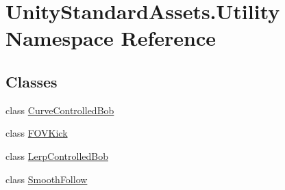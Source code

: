 \hypertarget{namespace_unity_standard_assets_1_1_utility}{}\section{Unity\+Standard\+Assets.\+Utility Namespace Reference}
\label{namespace_unity_standard_assets_1_1_utility}
\subsection*{Classes}
\begin{DoxyCompactItemize}
\item 
class \hyperlink{class_unity_standard_assets_1_1_utility_1_1_curve_controlled_bob}{Curve\+Controlled\+Bob}
\item 
class \hyperlink{class_unity_standard_assets_1_1_utility_1_1_f_o_v_kick}{F\+O\+V\+Kick}
\item 
class \hyperlink{class_unity_standard_assets_1_1_utility_1_1_lerp_controlled_bob}{Lerp\+Controlled\+Bob}
\item 
class \hyperlink{class_unity_standard_assets_1_1_utility_1_1_smooth_follow}{Smooth\+Follow}
\end{DoxyCompactItemize}
